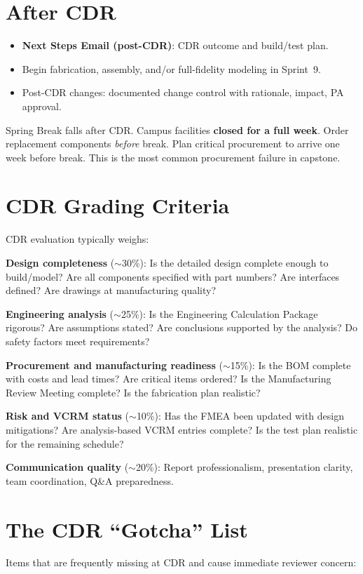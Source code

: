\section{After CDR}
\begin{itemize}[nosep,leftmargin=1.5em]
\item \textbf{Next Steps Email (post-CDR)}: CDR outcome and build/test plan.
\item Begin fabrication, assembly, and/or full-fidelity modeling in Sprint~9.
\item Post-CDR changes: documented change control with rationale, impact, PA approval.
\end{itemize}

\begin{warningbox}
Spring Break falls after CDR. Campus facilities \textbf{closed for a full week}. Order replacement components \emph{before} break. Plan critical procurement to arrive one week before break. This is the most common procurement failure in capstone.
\end{warningbox}


\section{CDR Grading Criteria}
CDR evaluation typically weighs:

\textbf{Design completeness} ($\sim$30\%): Is the detailed design complete enough to build/model? Are all components specified with part numbers? Are interfaces defined? Are drawings at manufacturing quality?

\textbf{Engineering analysis} ($\sim$25\%): Is the Engineering Calculation Package rigorous? Are assumptions stated? Are conclusions supported by the analysis? Do safety factors meet requirements?

\textbf{Procurement and manufacturing readiness} ($\sim$15\%): Is the BOM complete with costs and lead times? Are critical items ordered? Is the Manufacturing Review Meeting complete? Is the fabrication plan realistic?

\textbf{Risk and VCRM status} ($\sim$10\%): Has the FMEA been updated with design mitigations? Are analysis-based VCRM entries complete? Is the test plan realistic for the remaining schedule?

\textbf{Communication quality} ($\sim$20\%): Report professionalism, presentation clarity, team coordination, Q\&A preparedness.

\section{The CDR ``Gotcha'' List}
Items that are frequently missing at CDR and cause immediate reviewer concern:

